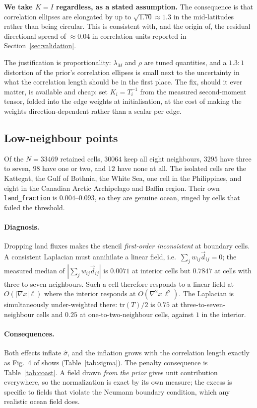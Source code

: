 \documentclass[11pt]{article}
\newcommand{\grid}{\ell}
\newcommand{\shat}{\hat{\sigma}}
\begin{document}
\textbf{We take $K = I$ regardless, as a stated assumption.} The consequence is that
correlation ellipses are elongated by up to $\sqrt{1.70}\approx 1.3$ in the mid-latitudes
rather than being circular. This is consistent with, and the origin of, the residual
directional spread of $\approx 0.04$ in correlation units reported in
Section~\ref{sec:validation}.

The justification is proportionality: $\lambda_M$ and $\rho$ are tuned quantities, and a
$1.3{:}1$ distortion of the prior's correlation ellipses is small next to the uncertainty
in what the correlation length should be in the first place. The fix, should it ever
matter, is available and cheap: set $K_i = T_i^{-1}$ from the measured second-moment
tensor, folded into the edge weights at initialisation, at the cost of making the weights
direction-dependent rather than a scalar per edge.

\subsection{Low-neighbour points}
\label{sec:lowneighbour}

Of the $N = 33469$ retained cells, $30064$ keep all eight neighbours, $3295$ have three to
seven, $98$ have one or two, and $12$ have none at all. The isolated cells are the
Kattegat, the Gulf of Bothnia, the White Sea, one cell in the Philippines, and eight in
the Canadian Arctic Archipelago and Baffin region. Their own \texttt{land\_fraction} is
$0.004$--$0.093$, so they are genuine ocean, ringed by cells that failed the threshold.

\paragraph{Diagnosis.} Dropping land fluxes makes the stencil \emph{first-order
inconsistent} at boundary cells. A consistent Laplacian must annihilate a linear field,
i.e.\ $\sum_j w_{ij}\vec{d}_{ij} = 0$; the measured median of
$\left|\sum_j w_{ij}\vec{d}_{ij}\right|$ is $0.0071$ at interior cells but $0.7847$ at
cells with three to seven neighbours. Such a cell therefore responds to a linear field at
$O(|\nabla x|\grid)$ where the interior responds at $O(\nabla^2 x\,\grid^2)$. The
Laplacian is simultaneously under-weighted there: $\mathrm{tr}(T)/2$ is $0.75$ at
three-to-seven-neighbour cells and $0.25$ at one-to-two-neighbour cells, against $1$ in
the interior.

\paragraph{Consequences.} Both effects inflate $\shat$, and the inflation grows with the
correlation length exactly as Fig.~4 of \citet{smith2022} shows (Table~\ref{tab:sigma}).
The penalty consequence is Table~\ref{tab:coast}. A field drawn \emph{from the prior}
gives unit contribution everywhere, so the normalization is exact by its own measure; the
excess is specific to fields that violate the Neumann boundary condition, which any
realistic ocean field does.
\end{document}
